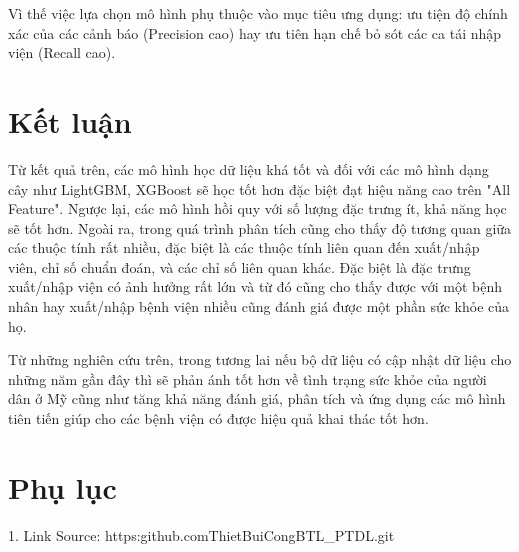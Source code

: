 \documentclass[12pt]{report} %
\begin{document}
Vì thế việc lựa chọn mô hình phụ thuộc vào mục tiêu ưng dụng: ưu tiện độ chính xác của các cảnh báo (Precision cao) hay ưu tiên hạn chế bỏ sót các ca tái nhập viện (Recall cao).

\section*{Kết luận}
Từ kết quả trên, các mô hình học dữ liệu khá tốt và đối với các mô hình dạng cây như LightGBM, XGBoost sẽ học tốt hơn đặc biệt đạt hiệu năng cao trên "All Feature". Ngược lại, các mô hình hồi quy
với số lượng đặc trưng ít, khả năng học sẽ tốt hơn. Ngoài ra, trong quá trình phân tích cũng cho thấy độ tương quan giữa các thuộc tính rất nhiều, đặc biệt là các thuộc tính liên quan đến
xuất/nhập viên, chỉ số chuẩn đoán, và các chỉ số liên quan khác. Đặc biệt là đặc trưng xuất/nhập viện có ảnh hưởng rất lớn và từ đó cũng cho thấy được với một bệnh nhân hay xuất/nhập bệnh viện nhiều cũng đánh giá được một phần
sức khỏe của họ.

Từ những nghiên cứu trên, trong tương lai nếu bộ dữ liệu có cập nhật dữ liệu cho những năm gần đây thì sẽ phản ánh tốt hơn về tình trạng sức khỏe của người dân ở Mỹ cũng như tăng khả năng đánh giá, phân tích và ứng dụng các mô hình tiên tiến giúp cho các bệnh viện có được hiệu quả khai thác tốt hơn.

\section*{Phụ lục}

1. Link Source: https:\/\/github.com\/ThietBuiCong\/BTL\_PTDL.git
\end{document}

